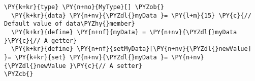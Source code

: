 \begin{Verbatim}[commandchars=\\\{\}]
\PY{k+kr}{type} \PY{n+no}{MyType}[] \PYZob{}
  \PY{k+kr}{data} \PY{n+nv}{\PYZdl{}myData }= \PY{l+m}{15} \PY{c}{// Default value of data\PYZhy{}member}
  \PY{k+kr}{define} \PY{n+nf}{myData} = \PY{n+nv}{\PYZdl{}myData }\PY{c}{// A getter}
  \PY{k+kr}{define} \PY{n+nf}{setMyData}[\PY{n+nv}{\PYZdl{}newValue] }= \PY{k+kr}{set} \PY{n+nv}{\PYZdl{}myData }= \PY{n+nv}{\PYZdl{}newValue }\PY{c}{// A setter}
\PYZcb{}
\end{Verbatim}
